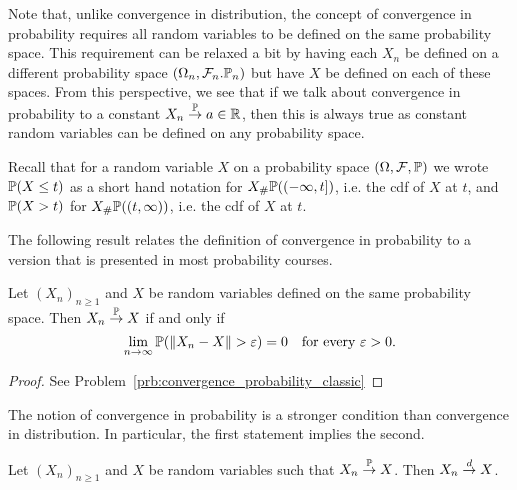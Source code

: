 \begin{remark}
Note that, unlike convergence in distribution, the concept of convergence in probability requires all random variables to be defined on the same probability space. This requirement can be relaxed a bit by having each $X_n$ be defined on a different probability space $(\Omega_n, \mathcal F_n. \mathbb P_n)$ but have $X$ be defined on each of these spaces. From this perspective, we see that if we talk about convergence in probability to a constant $X_n \stackrel{\mathbb P}{\rightarrow} a \in \mathbb R$, then this is always true as constant random variables can be defined on any probability space.
\end{remark}

Recall that for a random variable $X$ on a probability space $(\Omega, \mathcal F, \mathbb P)$ we wrote $\mathbb P(X \le t)$ as a short hand notation for $X_\# \mathbb P ((-\infty,t])$, i.e. the cdf of $X$ at $t$, and $\mathbb P(X > t)$ for $X_\# \mathbb P ((t,\infty))$, i.e. the cdf of $X$ at $t$.

The following result relates the definition of convergence in probability to a version that is presented in most probability courses.

\begin{lemma}\label{lem:convergence_probability_classical}
Let $(X_n)_{n \ge 1}$ and $X$ be random variables defined on the same probability space. Then $X_n \stackrel{\mathbb P}{\rightarrow} X$ if and only if
\[
	\lim_{n \to \infty} \mathbb P(\|X_n - X\| > \varepsilon) = 0 \quad \text{for every } \varepsilon > 0.
\]
\end{lemma}

\begin{proof}
See Problem~\ref{prb:convergence_probability_classic}
\end{proof}


The notion of convergence in probability is a stronger condition than convergence in distribution. In particular, the first statement implies the second. 

\begin{lemma}
Let $(X_n)_{n \ge 1}$ and $X$ be random variables such that $X_n \stackrel{\mathbb P}{\rightarrow} X$. Then $X_n \stackrel{d}{\rightarrow} X$.
\end{lemma}

